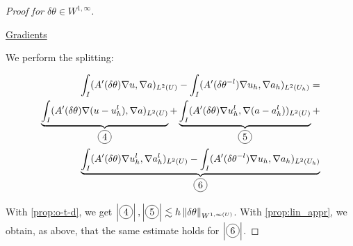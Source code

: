 \documentclass[english,a4paper,10pt,oneside]{scrbook}	%
\theoremstyle{break}
\newenvironment{mproof}[1][\proofname]{%
  \begin{proof}[#1]$ $\par\nobreak\ignorespaces
}{%
  \end{proof}
}
\renewcommand*{\proofname}{Proof}
\theoremstyle{remark}
\newcommand{\mR}{\mathbb{R}}
\newcommand{\ds}{\displaystyle}
\newcommand{\norm}[1]{\left\lVert#1\right\rVert}
\newcommand{\te}{\theta}
\newcommand{\dive}{\text{div}}
\newcommand*\circled[1]{\tikz[baseline=(char.base)]{
            \node[shape=circle,draw,inner sep=2pt] (char) {#1};}}
\begin{document}
\begin{mproof}[Proof for $\delta \te \in W^{1,\infty}$]





\underline{Gradients}

We perform the splitting:

\begin{align*}
	\int_I (A'(\delta\te )\nabla u, \nabla a)_{L^2(U)}-\int_I (A'(\delta\te^{-l} )\nabla u_h, \nabla a_h)_{L^2(U_h)} = \\
	\underbrace{\int_I (A'(\delta\te )\nabla (u-u_h^l), \nabla a)_{L^2(U)}}_{\circled{4}}+
	\underbrace{\int_I (A'(\delta\te )\nabla u_h^l, \nabla (a-a_h^l))_{L^2(U)}}_{\circled{5}}+\\
	\underbrace{\int_I (A'(\delta\te )\nabla u_h^l, \nabla a_h^l)_{L^2(U)} - \int_I (A'(\delta\te^{-l} )\nabla u_h, \nabla a_h)_{L^2(U_h)}}_{\circled{6}}
\end{align*}

With  \cref{prop:o-t-d}, we get $\ds  \left | \circled{4} \right |,  \left | \circled{5} \right | \lesssim h\norm{\delta \theta}_{W^{1,\infty(U)}}$. With \cref{prop:lin_appr}, we obtain, as above, that  the same estimate holds for $\left | \circled{6} \right |$.



\end{mproof}
\end{document}
